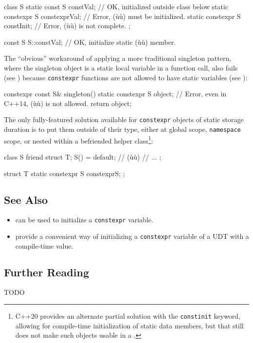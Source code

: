 \begin{emcppslisting}[emcppsbatch=e4]
class S
{
    static const     S constVal;      // OK, initialized outside class below
    static constexpr S constexprVal;  // Error, (ù{}ù) must be initialized.
    static constexpr S constInit{};   // Error, (ù{}ù) is not complete.
};

const S S::constVal{};  // OK, initialize static (ù{}ù) member.
\end{emcppslisting}
    
\noindent The ``obvious'' workaround of applying a more traditional singleton
pattern, where the singleton object is a static local variable in a
function call, also fails (see ) because \lstinline!constexpr! functions are not allowed to have
static variables (see ):

\begin{emcppslisting}[emcppsbatch=e4,emcppsignore={Invalid function}]
constexpr const S& singleton()
{
   static constexpr S object{};  // Error, even in C++14, (ù{}ù) is not allowed.
   return object;
}
\end{emcppslisting}
    
\noindent The only fully-featured solution available for \lstinline!constexpr!
objects of static storage duration is to put them outside of their type,
either at global scope, \lstinline!namespace! scope, or nested within a
befriended helper class{\cprotect\footnote{C++20 provides an alternate
partial solution with the \lstinline!constinit! keyword, allowing for
compile-time initialization of static data members, but that still
does not make such objects usable in a .}}:

\begin{emcppslisting}
class S
{
    friend struct T;
    S() = default;  // (ù{}ù)
    // ...
};

struct T
{
    static constexpr S constexprS{};
};
\end{emcppslisting}
    

\subsection[See Also]{See Also}\label{see-also}

\begin{itemize}
\item{can be used to initialize a \lstinline!constexpr! variable.}
\item{provide a convenient way of initializing a \lstinline!constexpr! variable of a UDT with a compile-time value.}
\end{itemize}

\subsection[Further Reading]{Further Reading}\label{further-reading}

TODO

